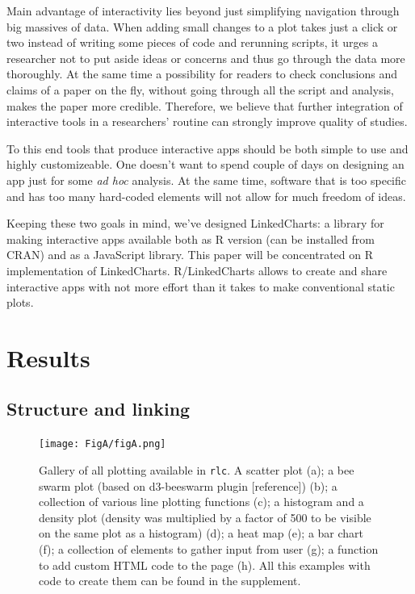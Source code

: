 \documentclass[twocolumn,10pt]{article}
\begin{document}
Main advantage of interactivity lies beyond just simplifying navigation through big massives of data. When adding small changes to a plot takes just a click or two instead of writing some pieces of code and rerunning scripts, it urges a researcher not to put aside ideas or concerns and thus go through the data more thoroughly. At the same time a possibility for readers to check conclusions and claims of a paper on the fly, without going through all the script and analysis, makes the paper more credible. Therefore, we believe that further integration of interactive tools in a researchers' routine can strongly improve quality of studies.

To this end tools that produce interactive apps should be both simple to use and highly customizeable. One doesn't want to spend couple of days on designing an app just for some \emph{ad hoc} analysis. At the same time, software that is too specific and has too many hard-coded elements will not allow for much freedom of ideas.

Keeping these two goals in mind, we've designed LinkedCharts: a library for making interactive apps available both as R version (can be installed from CRAN) and as a JavaScript library. This paper will be concentrated on R implementation of LinkedCharts. R/LinkedCharts allows to create and share interactive apps with not more effort than it takes to make conventional static plots.

\section{Results}
\subsection{Structure and linking}
\begin{figure}
	\texttt{[image: FigA/figA.png]}
	\caption{Gallery of all plotting available in \texttt{rlc}. A scatter plot (a); a bee swarm plot (based on d3-beeswarm plugin [reference]) (b); a collection of various line plotting functions (c); a histogram and a density plot (density was multiplied by a factor of 500 to be visible on the same plot as a histogram) (d); a heat map (e); a bar chart (f); a collection of elements to gather input from user (g); a function to add custom HTML code to the page (h). All this examples with code to create them can be found in the supplement.}
	\label{FigA}
\end{figure}
\end{document}
